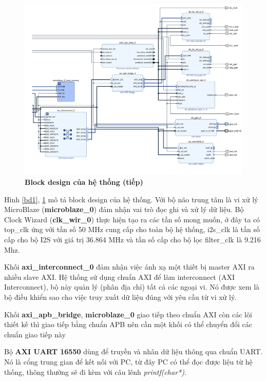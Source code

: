\begin{figure}[H]
    \centering
    \includegraphics[width=15cm]{Images/Chuong5/fpga/block_design_2.png}
    \caption[Block design của hệ thống (tiếp)]{\bfseries \fontsize{12pt}{0pt}\selectfont Block design của hệ thống (tiếp)}
    \label{bd2}
\end{figure}
Hình \ref{bd1}, \ref{bd2} mô tả block design của hệ thống. Với bộ não trung tâm là vi xử lý MicroBlaze (\textbf{microblaze\_0}) đảm nhận vai trò đọc ghi và xử lý dữ liệu. Bộ Clock Wizard (\textbf{clk\_wir\_0}) thực hiện tạo ra các tần số mong muốn, ở đây ta có top\_clk ứng với tần số 50 MHz cung cấp cho toàn bộ hệ thống, i2s\_clk là tần số cấp cho bộ I2S với giá trị 36.864 MHz và tần số cấp cho bộ lọc filter\_clk là 9.216 Mhz.

 Khối \textbf{axi\_interconnect\_0} đảm nhận việc ánh xạ một thiết bị master AXI ra nhiều slave AXI. Hệ thống sử dụng chuẩn AXI để làm interconnect (AXI Interconnect), bộ này quản lý (phân địa chỉ) tất cả các ngoại vi. Nó được xem là bộ điều khiển sao cho việc truy xuất dữ liệu đúng với yêu cầu từ vi xử lý.

Khối \textbf{axi\_apb\_bridge}, \textbf{microblaze\_0} giao tiếp theo chuẩn AXI còn các lõi 
thiết kế thì giao tiếp bằng chuẩn APB nên cần một khối có thể chuyển đổi các chuẩn 
giao tiếp này


Bộ \textbf{AXI UART 16550} dùng để truyền và nhân dữ liệu thông qua chuẩn UART. Nó là cổng trung gian để kết nối với PC, từ đây PC có thể đọc được liệu từ hệ thống, thông thường sẽ đi kèm với câu lênh \textit{printf(char*)}.

